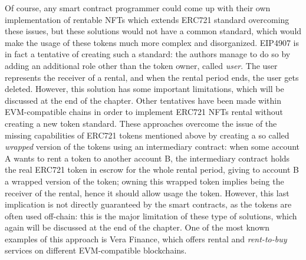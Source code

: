 \documentclass[english, LaM, oneside]{sapthesis}%
\begin{document}
Of course, any smart contract programmer could come up with their own implementation of rentable NFTs which extends ERC721 standard overcoming these issues, but these solutions would not have a common standard, which would make the usage of these tokens much more complex and disorganized.\newline
EIP4907 is in fact a tentative of creating such a standard: the authors manage to do so by adding an additional role other than the token owner, called \textit{user}. The user represents the receiver of a rental, and when the rental period ends, the user gets deleted. However, this solution has some important limitations, which will be discussed at the end of the chapter.\newline
Other tentatives have been made within EVM-compatible chains in order to implement ERC721 NFTs rental without creating a new token standard. These approaches overcome the issue of the missing capabilities of ERC721 tokens mentioned above by creating a so called \textit{wrapped} version of the tokens using an intermediary contract: when some account A wants to rent a token to another account B, the intermediary contract holds the real ERC721 token in escrow for the whole rental period, giving to account B a wrapped version of the token; owning this wrapped token implies being the receiver of the rental, hence it should allow usage the token. However, this last implication is not directly guaranteed by the smart contracts, as the tokens are often used off-chain: this is the major limitation of these type of solutions, which again will be discussed at the end of the chapter.
One of the most known examples of this approach is Vera Finance\cite{ref:vera}, which offers rental and \textit{rent-to-buy} services on different EVM-compatible blockchains.
\end{document}
